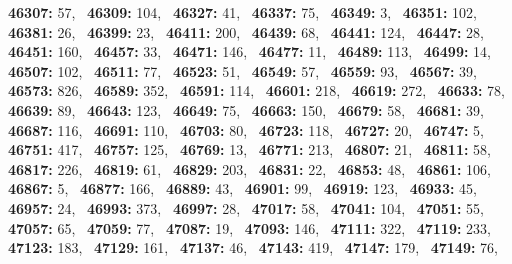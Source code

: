 \textbf{46307:} 57,\allowbreak~ 
\textbf{46309:} 104,\allowbreak~ 
\textbf{46327:} 41,\allowbreak~ 
\textbf{46337:} 75,\allowbreak~ 
\textbf{46349:} 3,\allowbreak~ 
\textbf{46351:} 102,\allowbreak~ 
\textbf{46381:} 26,\allowbreak~ 
\textbf{46399:} 23,\allowbreak~ 
\textbf{46411:} 200,\allowbreak~ 
\textbf{46439:} 68,\allowbreak~ 
\textbf{46441:} 124,\allowbreak~ 
\textbf{46447:} 28,\allowbreak~ 
\textbf{46451:} 160,\allowbreak~ 
\textbf{46457:} 33,\allowbreak~ 
\textbf{46471:} 146,\allowbreak~ 
\textbf{46477:} 11,\allowbreak~ 
\textbf{46489:} 113,\allowbreak~ 
\textbf{46499:} 14,\allowbreak~ 
\textbf{46507:} 102,\allowbreak~ 
\textbf{46511:} 77,\allowbreak~ 
\textbf{46523:} 51,\allowbreak~ 
\textbf{46549:} 57,\allowbreak~ 
\textbf{46559:} 93,\allowbreak~ 
\textbf{46567:} 39,\allowbreak~ 
\textbf{46573:} 826,\allowbreak~ 
\textbf{46589:} 352,\allowbreak~ 
\textbf{46591:} 114,\allowbreak~ 
\textbf{46601:} 218,\allowbreak~ 
\textbf{46619:} 272,\allowbreak~ 
\textbf{46633:} 78,\allowbreak~ 
\textbf{46639:} 89,\allowbreak~ 
\textbf{46643:} 123,\allowbreak~ 
\textbf{46649:} 75,\allowbreak~ 
\textbf{46663:} 150,\allowbreak~ 
\textbf{46679:} 58,\allowbreak~ 
\textbf{46681:} 39,\allowbreak~ 
\textbf{46687:} 116,\allowbreak~ 
\textbf{46691:} 110,\allowbreak~ 
\textbf{46703:} 80,\allowbreak~ 
\textbf{46723:} 118,\allowbreak~ 
\textbf{46727:} 20,\allowbreak~ 
\textbf{46747:} 5,\allowbreak~ 
\textbf{46751:} 417,\allowbreak~ 
\textbf{46757:} 125,\allowbreak~ 
\textbf{46769:} 13,\allowbreak~ 
\textbf{46771:} 213,\allowbreak~ 
\textbf{46807:} 21,\allowbreak~ 
\textbf{46811:} 58,\allowbreak~ 
\textbf{46817:} 226,\allowbreak~ 
\textbf{46819:} 61,\allowbreak~ 
\textbf{46829:} 203,\allowbreak~ 
\textbf{46831:} 22,\allowbreak~ 
\textbf{46853:} 48,\allowbreak~ 
\textbf{46861:} 106,\allowbreak~ 
\textbf{46867:} 5,\allowbreak~ 
\textbf{46877:} 166,\allowbreak~ 
\textbf{46889:} 43,\allowbreak~ 
\textbf{46901:} 99,\allowbreak~ 
\textbf{46919:} 123,\allowbreak~ 
\textbf{46933:} 45,\allowbreak~ 
\textbf{46957:} 24,\allowbreak~ 
\textbf{46993:} 373,\allowbreak~ 
\textbf{46997:} 28,\allowbreak~ 
\textbf{47017:} 58,\allowbreak~ 
\textbf{47041:} 104,\allowbreak~ 
\textbf{47051:} 55,\allowbreak~ 
\textbf{47057:} 65,\allowbreak~ 
\textbf{47059:} 77,\allowbreak~ 
\textbf{47087:} 19,\allowbreak~ 
\textbf{47093:} 146,\allowbreak~ 
\textbf{47111:} 322,\allowbreak~ 
\textbf{47119:} 233,\allowbreak~ 
\textbf{47123:} 183,\allowbreak~ 
\textbf{47129:} 161,\allowbreak~ 
\textbf{47137:} 46,\allowbreak~ 
\textbf{47143:} 419,\allowbreak~ 
\textbf{47147:} 179,\allowbreak~ 
\textbf{47149:} 76,\allowbreak~ 
